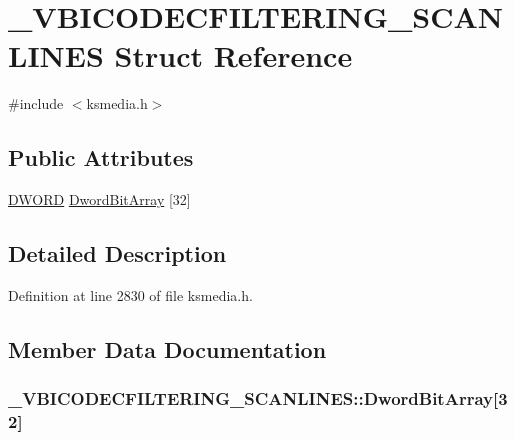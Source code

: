 \hypertarget{struct___v_b_i_c_o_d_e_c_f_i_l_t_e_r_i_n_g___s_c_a_n_l_i_n_e_s}{}\section{\+\_\+\+V\+B\+I\+C\+O\+D\+E\+C\+F\+I\+L\+T\+E\+R\+I\+N\+G\+\_\+\+S\+C\+A\+N\+L\+I\+N\+ES Struct Reference}
\label{struct___v_b_i_c_o_d_e_c_f_i_l_t_e_r_i_n_g___s_c_a_n_l_i_n_e_s}


{\ttfamily \#include $<$ksmedia.\+h$>$}

\subsection*{Public Attributes}
\begin{DoxyCompactItemize}
\item 
\hyperlink{mapinls_8h_ad342ac907eb044443153a22f964bf0af}{D\+W\+O\+RD} \hyperlink{struct___v_b_i_c_o_d_e_c_f_i_l_t_e_r_i_n_g___s_c_a_n_l_i_n_e_s_aa12fc1045b4987a1b52392bdcac8911f}{Dword\+Bit\+Array} \mbox{[}32\mbox{]}
\end{DoxyCompactItemize}


\subsection{Detailed Description}


Definition at line 2830 of file ksmedia.\+h.



\subsection{Member Data Documentation}
\subsubsection[{\texorpdfstring{Dword\+Bit\+Array}{DwordBitArray}}]{ \+\_\+\+V\+B\+I\+C\+O\+D\+E\+C\+F\+I\+L\+T\+E\+R\+I\+N\+G\+\_\+\+S\+C\+A\+N\+L\+I\+N\+E\+S\+::\+Dword\+Bit\+Array\mbox{[}32\mbox{]}}\hypertarget{struct___v_b_i_c_o_d_e_c_f_i_l_t_e_r_i_n_g___s_c_a_n_l_i_n_e_s_aa12fc1045b4987a1b52392bdcac8911f}{}\label{struct___v_b_i_c_o_d_e_c_f_i_l_t_e_r_i_n_g___s_c_a_n_l_i_n_e_s_aa12fc1045b4987a1b52392bdcac8911f}


